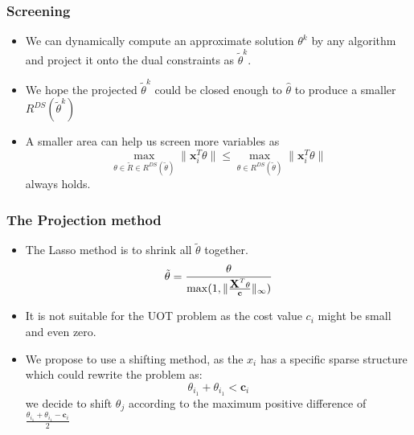 \documentclass[dvipdfmx,cjk,t,10pt]{beamer}
\renewcommand{\vec}[1]{\mathbf{#1}}
\begin{document}
\begin{frame}
\frametitle{Screening}
	\begin{itemize}
		\item We can dynamically compute an approximate solution $\theta^{k}$ by any algorithm and project it onto the dual constraints as $\tilde{\theta}^{k}$.
		\item We hope the projected $\tilde{\theta}^{k}$ could be closed enough to $\hat{\theta}$ to produce a smaller $R^{DS}(\tilde{\theta}^{k})$
		\item A smaller area can help us screen more variables as 
		$$
		\max_{\theta \in \tilde{R} \in R^{DS}(\tilde{\theta})}{\|\vec{x}_i^{T}\theta\|} \leq \max_{\theta \in R^{DS}(\tilde{\theta})}{\|\vec{x}_i^{T}\theta\|} 
		$$
		always holds.

	\end{itemize}
	
\end{frame}


\begin{frame}
\frametitle{The Projection method}
	\begin{itemize}
		\item The Lasso method is to shrink all $\tilde{\theta}$ together.
		$$
			\tilde{\theta} = \frac{\theta}{\max(1,\|\frac{\mat{X}^{T}\theta}{\vec{c}}\|_{\infty})}
		$$
	
		\item It is not suitable for the UOT problem as the cost value $c_{i}$ might be small and even zero. 
		\item We propose to use a shifting method, as the $x_{i}$ has a specific sparse structure which could rewrite the problem as:
		$$
		\theta_{i_{1}}+\theta_{i_{1}}<\vec{c}_i
		$$
		we decide to shift $\theta_{j}$ according to the maximum positive difference of $	\frac{\theta_{i_{1}}+\theta_{i_{1}}-\vec{c}_i}{2}$
	\end{itemize}
\end{frame}
\end{document}
